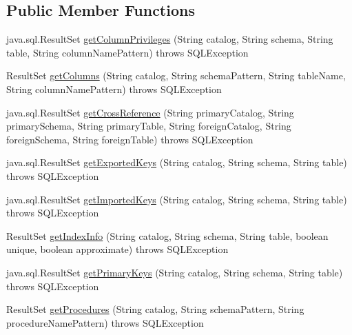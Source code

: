 \subsection*{Public Member Functions}
\begin{DoxyCompactItemize}
\item 
java.\+sql.\+Result\+Set \mbox{\hyperlink{classcom_1_1mysql_1_1cj_1_1jdbc_1_1_database_meta_data_using_info_schema_a2701efc264507afb24a891f51d8497c7}{get\+Column\+Privileges}} (String catalog, String schema, String table, String column\+Name\+Pattern)  throws S\+Q\+L\+Exception 
\item 
Result\+Set \mbox{\hyperlink{classcom_1_1mysql_1_1cj_1_1jdbc_1_1_database_meta_data_using_info_schema_a76ac6f1cc59fc5cc7198bd206d70b06e}{get\+Columns}} (String catalog, String schema\+Pattern, String table\+Name, String column\+Name\+Pattern)  throws S\+Q\+L\+Exception 
\item 
java.\+sql.\+Result\+Set \mbox{\hyperlink{classcom_1_1mysql_1_1cj_1_1jdbc_1_1_database_meta_data_using_info_schema_a78af57a69e485d80693e631caab23b0a}{get\+Cross\+Reference}} (String primary\+Catalog, String primary\+Schema, String primary\+Table, String foreign\+Catalog, String foreign\+Schema, String foreign\+Table)  throws S\+Q\+L\+Exception 
\item 
java.\+sql.\+Result\+Set \mbox{\hyperlink{classcom_1_1mysql_1_1cj_1_1jdbc_1_1_database_meta_data_using_info_schema_a6e40c5eff2034138c5b6d97c8f15a5f9}{get\+Exported\+Keys}} (String catalog, String schema, String table)  throws S\+Q\+L\+Exception 
\item 
java.\+sql.\+Result\+Set \mbox{\hyperlink{classcom_1_1mysql_1_1cj_1_1jdbc_1_1_database_meta_data_using_info_schema_a2d06b32656148d141c496e50baf86d1c}{get\+Imported\+Keys}} (String catalog, String schema, String table)  throws S\+Q\+L\+Exception 
\item 
Result\+Set \mbox{\hyperlink{classcom_1_1mysql_1_1cj_1_1jdbc_1_1_database_meta_data_using_info_schema_ad48b81b8bb1e376e146d816307ece3cc}{get\+Index\+Info}} (String catalog, String schema, String table, boolean unique, boolean approximate)  throws S\+Q\+L\+Exception 
\item 
java.\+sql.\+Result\+Set \mbox{\hyperlink{classcom_1_1mysql_1_1cj_1_1jdbc_1_1_database_meta_data_using_info_schema_a1f0bdccd4ada6003df046679671db018}{get\+Primary\+Keys}} (String catalog, String schema, String table)  throws S\+Q\+L\+Exception 
\item 
Result\+Set \mbox{\hyperlink{classcom_1_1mysql_1_1cj_1_1jdbc_1_1_database_meta_data_using_info_schema_aa11c57b668f3faec0d47c227012ab3d5}{get\+Procedures}} (String catalog, String schema\+Pattern, String procedure\+Name\+Pattern)  throws S\+Q\+L\+Exception 

\end{DoxyCompactItemize}
